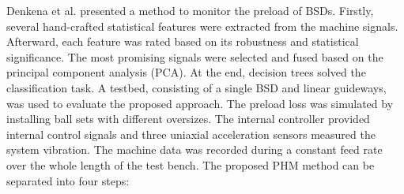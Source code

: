 Denkena et al. \cite{Denkena2021} presented a method to monitor the preload of BSDs. Firstly, several hand-crafted statistical features were extracted from the machine signals. Afterward, each feature was rated based on its robustness and statistical significance. The most promising signals were selected and fused based on the principal component analysis (PCA). At the end, decision trees solved the classification task. A testbed, consisting of a single BSD and linear guideways, was used to evaluate the proposed approach. The preload loss was simulated by installing ball sets with different oversizes. The internal controller provided internal control signals and three uniaxial acceleration sensors measured the system vibration. The machine data was recorded during a constant feed rate over the whole length of the test bench. The proposed PHM method can be separated into four steps:

